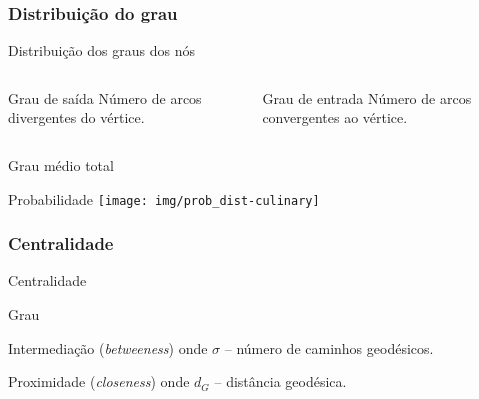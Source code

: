 \documentclass[ignorenonframetext]{beamer}
\def\vertex{vértice}
\begin{document}
\subsubsection{Distribuição do grau}

\begin{frame}{Distribuição dos graus dos nós}
\small
\begin{columns}
\begin{column}{0.5\textwidth}
\begin{block}{Grau de saída}
Número de arcos divergentes do \vertex.\\
\kouteq
\kavgouteq
\end{block}
\end{column}

\begin{column}{0.5\textwidth}
\begin{block}{Grau de entrada}
Número de arcos convergentes ao \vertex.\\
\kineq
\kavgineq
\end{block}
\end{column}
\end{columns}

\begin{block}{Grau médio total}
\kavgeq
\end{block}


\end{frame}

\begin{frame}{Probabilidade}
\probeq
\texttt{[image: img/prob\_dist-culinary]}
\cite{kinouchi}
\end{frame}

\subsubsection{Centralidade}

\begin{frame}{Centralidade}

\begin{block}{Grau}
\degcentreq
\end{block}
\begin{block}{Intermediação ({\em betweeness})}
\betcentreq
\noindent onde $\sigma$ -- número de caminhos geodésicos.
\end{block}
\begin{block}{Proximidade ({\em closeness})}
\closecentreq
\noindent onde $d_G$ -- distância geodésica.
\end{block}

\end{frame}
\end{document}
